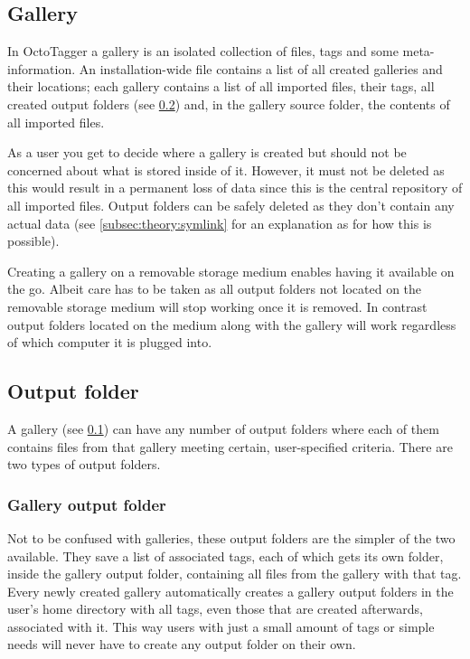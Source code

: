 \subsection{Gallery}%
\label{subsec:theory:gallery}

In OctoTagger a gallery is an isolated collection of files, tags and some
meta-information. An installation-wide file contains a list of all created
galleries and their locations; each gallery contains a list of all imported
files, their tags, all created output folders (see
\cref{subsec:theory:output_folder}) and, in the gallery source folder, the
contents of all imported files.

As a user you get to decide where a gallery is created but should not be
concerned about what is stored inside of it. However, it must not be deleted as
this would result in a permanent loss of data since this is the central
repository of all imported files. Output folders can be safely deleted as they
don't contain any actual data (see \cref{subsec:theory:symlink} for an
explanation as for how this is possible).

Creating a gallery on a removable storage medium enables having it available
on the go. Albeit care has to be taken as all output folders not located on the
removable storage medium will stop working once it is removed. In contrast
output folders located on the medium along with the gallery will work
regardless of which computer it is plugged into.

\subsection{Output folder}%
\label{subsec:theory:output_folder}

A gallery (see \cref{subsec:theory:gallery}) can have any number of output
folders where each of them contains files from that gallery meeting certain,
user-specified criteria. There are two types of output folders.

\subsubsection{Gallery output folder}

Not to be confused with galleries, these output folders are the simpler of the
two available. They save a list of associated tags, each of which gets its own
folder, inside the gallery output folder, containing all files from the gallery
with that tag. Every newly created gallery automatically creates a gallery
output folders in the user's home directory with all tags, even those that are
created afterwards, associated with it. This way users with just a small amount
of tags or simple needs will never have to create any output folder on their
own.


